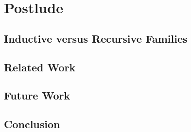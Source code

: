 \documentclass[12pt]{report}
\theoremstyle{definition}
\theoremstyle{remark}
\numberwithin{definition}{section}
\numberwithin{equation}{section}
\numberwithin{proposition}{section}
\numberwithin{conjecture}{section}
\numberwithin{theorem}{section}
\numberwithin{lemma}{section}
\numberwithin{corollary}{section}
\numberwithin{example}{section}
\numberwithin{remark}{section}
\begin{document}


\part{Postlude}\label{part:postlude}
\chapter{Inductive versus Recursive Families}\label{ch:ivsr}
\chapter{Related Work}\label{ch:related}
\chapter{Future Work}\label{ch:future}
\chapter{Conclusion}\label{ch:conc}




\end{document}
